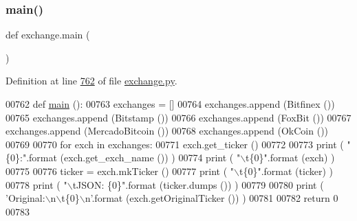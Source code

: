 \subsubsection{\texorpdfstring{main()}{main()}}
{\footnotesize\ttfamily def exchange.\+main (\begin{DoxyParamCaption}{ }\end{DoxyParamCaption})}



Definition at line \hyperlink{exchange_8py_source_l00762}{762} of file \hyperlink{exchange_8py_source}{exchange.\+py}.


\begin{DoxyCode}
00762 \textcolor{keyword}{def }\hyperlink{namespaceexchange_aa5b6297f878f52d360f5c42066aa097b}{main} ():
00763     exchanges = []
00764     exchanges.append (Bitfinex ())
00765     exchanges.append (Bitstamp ())
00766     exchanges.append (FoxBit ())
00767     exchanges.append (MercadoBitcoin ())
00768     exchanges.append (OkCoin ())
00769     
00770     \textcolor{keywordflow}{for} exch \textcolor{keywordflow}{in} exchanges:
00771         exch.get\_ticker ()
00772         
00773         \textcolor{keywordflow}{print} ( \textcolor{stringliteral}{"\{0\}:"}.format (exch.get\_exch\_name ()) )
00774         \textcolor{keywordflow}{print} ( \textcolor{stringliteral}{"\(\backslash\)t\{0\}"}.format (exch) )
00775         
00776         ticker = exch.mkTicker ()
00777         \textcolor{keywordflow}{print} ( \textcolor{stringliteral}{"\(\backslash\)t\{0\}"}.format (ticker) )
00778         \textcolor{keywordflow}{print} ( \textcolor{stringliteral}{"\(\backslash\)tJSON: \{0\}"}.format (ticker.dumps ()) )
00779         
00780         \textcolor{keywordflow}{print} ( \textcolor{stringliteral}{'Original:\(\backslash\)n\(\backslash\)t\{0\}\(\backslash\)n'}.format (exch.getOriginalTicker ()) )
00781     
00782     \textcolor{keywordflow}{return} 0
00783     
\end{DoxyCode}
